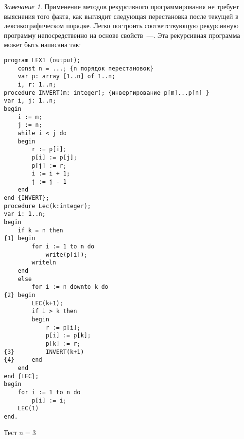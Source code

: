 \documentclass[12pt,a4paper]{article}
\theoremstyle{plain}
\theoremstyle{definition}
\theoremstyle{remark}
\newtheorem*{remark}{Замечание}
\newtheorem*{comment}{Комментарий}
\begin{document}
\begin{remark}
Применение методов рекурсивного программирования не требует выяснения того факта, как выглядит следующая перестановка после текущей в лексикографическом порядке. Легко построить соответствующую рекурсивную программу непосредственно на основе свойств~---. Эта рекурсивная программа может быть написана так:
\end{remark}

\begin{verbatim}
program LEX1 (output);
    const n = ...; {n порядок перестановок}
    var p: array [1..n] of 1..n;
    i, r: 1..n;
procedure INVERT(m: integer); {инвертирование p[m]...p[n] }
var i, j: 1..n;
begin
    i := m;
    j := n;
    while i < j do
    begin 
        r := p[i];
        p[i] := p[j];
        p[j] := r;
        i := i + 1;
        j := j - 1
    end
end {INVERT};
procedure Lec(k:integer);
var i: 1..n;
begin
    if k = n then
{1} begin
        for i := 1 to n do 
            write(p[i]);
        writeln
    end
    else
        for i := n downto k do
{2} begin
        LEC(k+1);
        if i > k then
        begin
            r := p[i];
            p[i] := p[k];
            p[k] := r;
{3}         INVERT(k+1)
{4}     end
    end
end {LEC};
begin
    for i := 1 to n do
        p[i] := i;
    LEC(1)
end.
\end{verbatim}

\begin{comment}
Процедура \verb@INVERT@ служит для восстановления первоначальной перестановки (свойство~\nameref{L1}) после генерации всех перестановок данного обобщенного блока. Процедура \verb@LEC@ осуществляет либо печать перестановки (строка \verb@{1}@), если все $n$ позиций уже сформированы, либо (по свойству~\nameref{L2}) генерирует перестановки $n-k+1$ порядка как последовательность $n-k+1$ блоков перестановок $n-k$ порядка с возрастающим по значению элементом на $k$ позиции.
\end{comment}

Тест $n=3$
\end{document}
